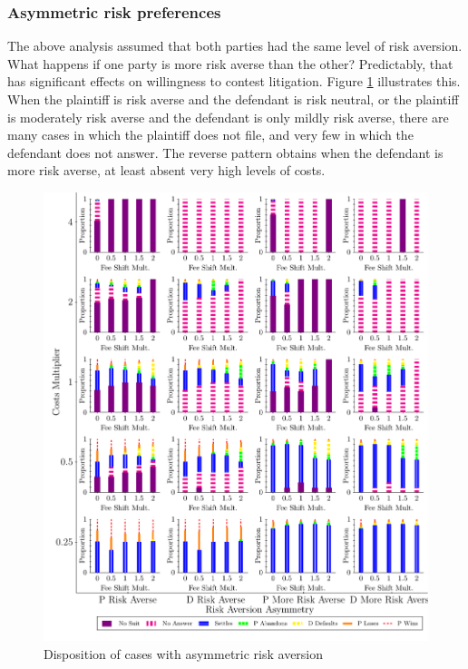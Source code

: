 \documentclass{article}
\begin{document}
\subsubsection{Asymmetric risk preferences}

The above analysis assumed that both parties had the same level of risk aversion. What happens if one party is more risk averse than the other? Predictably, that has significant effects on willingness to contest litigation. Figure \ref{fig:disposition_riskaversionasymmetry} illustrates this. When the plaintiff is risk averse and the defendant is risk neutral, or the plaintiff is moderately risk averse and the defendant is only mildly risk averse, there are many cases in which the plaintiff does not file, and very few in which the defendant does not answer. The reverse pattern obtains when the defendant is more risk averse, at least absent very high levels of costs.

\begin{figure}[h!]
\centering
\includegraphics[scale=0.50, trim={0in 0in 0in 0in}, clip]{../Figures/Disposition Varying Risk Aversion Asymmetry.pdf}
\caption{Disposition of cases with asymmetric risk aversion}
\label{fig:disposition_riskaversionasymmetry}
\end{figure}
\end{document}
